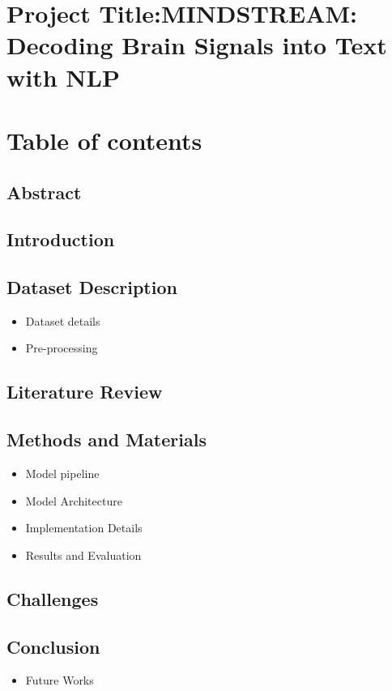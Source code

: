 \documentclass[11pt]{article}
\author{Kritika Prasai}
\date{\today}
\title{}
\begin{document}
\tableofcontents

\section{Project Title:MINDSTREAM: Decoding Brain Signals into Text with NLP}
\label{sec:orgd3539bf}

\section{Table of contents}
\label{sec:org9bd2a98}
\subsection{Abstract}
\label{sec:org3f6a85a}
\subsection{Introduction}
\label{sec:org185744e}
\subsection{Dataset Description}
\label{sec:org281a632}
\begin{itemize}
\item Dataset details
\item Pre-processing
\end{itemize}
\subsection{Literature Review}
\label{sec:orgebfc69c}
\subsection{Methods and Materials}
\label{sec:org8f4d832}
\begin{itemize}
\item Model pipeline
\item Model Architecture
\item Implementation Details
\item Results and Evaluation
\end{itemize}
\subsection{Challenges}
\label{sec:orgbb63d8e}
\subsection{Conclusion}
\label{sec:org1f0db80}
\begin{itemize}
\item Future Works
\end{itemize}
\end{document}
